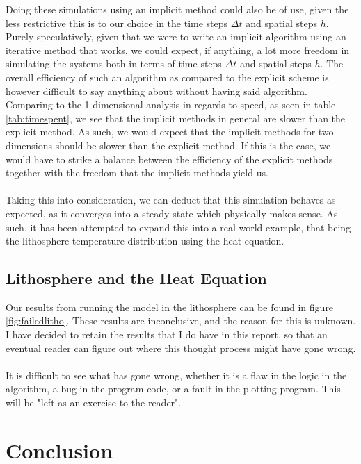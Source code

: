 \documentclass[reprint,english,notitlepage]{revtex4-1}  %
\begin{document}
Doing these simulations using an implicit method could also be of use, given the less restrictive this is to our choice in the time steps $\Delta t$ and spatial steps $h$. Purely speculatively, given that we were to write an implicit algorithm using an iterative method that works, we could expect, if anything, a lot more freedom in simulating the systems both in terms of time steps $\Delta t$ and spatial steps $h$. The overall efficiency of such an algorithm as compared to the explicit scheme is however difficult to say anything about without having said algorithm. Comparing to the 1-dimensional analysis in regards to speed, as seen in table \ref{tab:timespent}, we see that the implicit methods in general are slower than the explicit method. As such, we would expect that the implicit methods for two dimensions should be slower than the explicit method. If this is the case, we would have to strike a balance between the efficiency of the explicit methods together with the freedom that the implicit methods yield us.
\\
\\
Taking this into consideration, we can deduct that this simulation behaves as expected, as it converges into a steady state which physically makes sense. As such, it has been attempted to expand this into a real-world example, that being the lithosphere temperature distribution using the heat equation.

\subsection{Lithosphere and the Heat Equation}

Our results from running the model in the lithosphere can be found in figure \ref{fig:failedlitho}. These results are inconclusive, and the reason for this is unknown. I have decided to retain the results that I do have in this report, so that an eventual reader can figure out where this thought process might have gone wrong.
\\
\\
It is difficult to see what has gone wrong, whether it is a flaw in the logic in the algorithm, a bug in the program code, or a fault in the plotting program. This will be "left as an exercise to the reader".

\newpage

\section{Conclusion}
\end{document}
